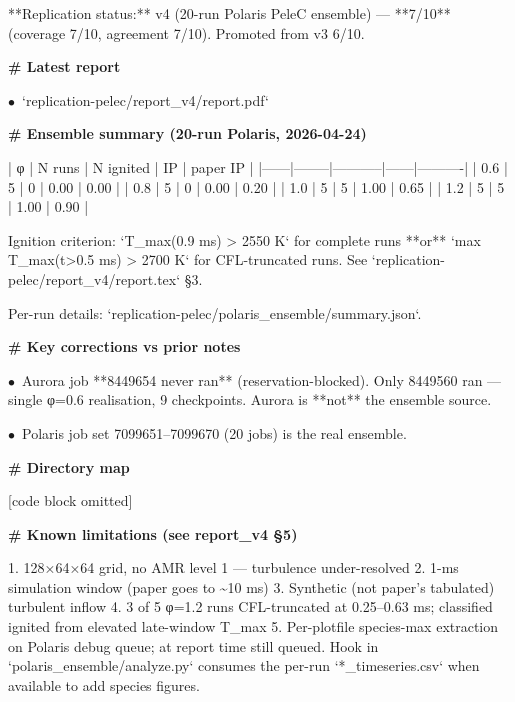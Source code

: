 \documentclass[11pt]{article}
\begin{document}
**Replication status:** v4 (20-run Polaris PeleC ensemble) — **7/10**
(coverage 7/10, agreement 7/10). Promoted from v3 6/10.

\par\medskip\textbf{\# Latest report}\par
\par$\bullet$\ `replication-pelec/report\_v4/report.pdf`

\par\medskip\textbf{\# Ensemble summary (20-run Polaris, 2026-04-24)}\par

| φ    | N runs | N ignited | IP   | paper IP |
|------|--------|-----------|------|----------|
| 0.6  | 5      | 0         | 0.00 | 0.00     |
| 0.8  | 5      | 0         | 0.00 | 0.20     |
| 1.0  | 5      | 5         | 1.00 | 0.65     |
| 1.2  | 5      | 5         | 1.00 | 0.90     |

Ignition criterion: `T\_max(0.9 ms) \textgreater{} 2550 K` for complete runs **or**
`max T\_max(t\textgreater{}0.5 ms) \textgreater{} 2700 K` for CFL-truncated runs. See
`replication-pelec/report\_v4/report.tex` §3.

Per-run details: `replication-pelec/polaris\_ensemble/summary.json`.

\par\medskip\textbf{\# Key corrections vs prior notes}\par
\par$\bullet$\ Aurora job **8449654 never ran** (reservation-blocked). Only 8449560
  ran — single φ=0.6 realisation, 9 checkpoints. Aurora is **not** the
  ensemble source.
\par$\bullet$\ Polaris job set 7099651–7099670 (20 jobs) is the real ensemble.

\par\medskip\textbf{\# Directory map}\par

[code block omitted]

\par\medskip\textbf{\# Known limitations (see report\_v4 §5)}\par

1. 128×64×64 grid, no AMR level 1 — turbulence under-resolved
2. 1-ms simulation window (paper goes to \textasciitilde{}10 ms)
3. Synthetic (not paper's tabulated) turbulent inflow
4. 3 of 5 φ=1.2 runs CFL-truncated at 0.25–0.63 ms; classified ignited
   from elevated late-window T\_max
5. Per-plotfile species-max extraction on Polaris debug queue; at report
   time still queued. Hook in `polaris\_ensemble/analyze.py` consumes the
   per-run `*\_timeseries.csv` when available to add species figures.
\normalsize
\end{document}
